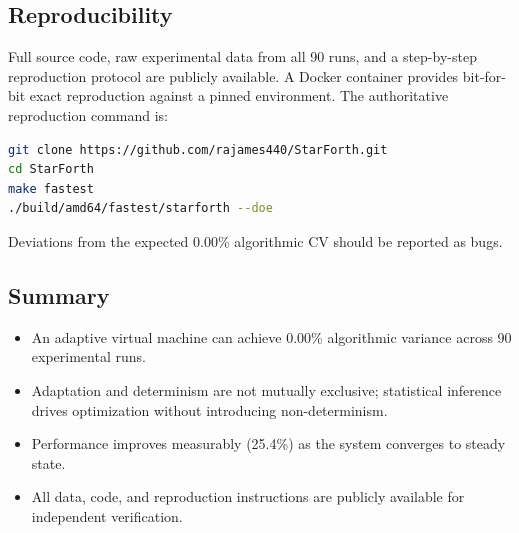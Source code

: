 \subsection{Reproducibility}

Full source code, raw experimental data from all 90 runs, and a
step-by-step reproduction protocol are publicly available. A Docker container
provides bit-for-bit exact reproduction against a pinned environment. The
authoritative reproduction command is:

\begin{lstlisting}[language=bash]
git clone https://github.com/rajames440/StarForth.git
cd StarForth
make fastest
./build/amd64/fastest/starforth --doe
\end{lstlisting}

Deviations from the expected 0.00\% algorithmic CV should be reported as bugs.

\subsection{Summary}

\begin{itemize}
  \item An adaptive virtual machine can achieve 0.00\% algorithmic variance
    across 90 experimental runs.
  \item Adaptation and determinism are not mutually exclusive; statistical
    inference drives optimization without introducing non-determinism.
  \item Performance improves measurably (25.4\%) as the system converges to
    steady state.
  \item All data, code, and reproduction instructions are publicly available
    for independent verification.
\end{itemize}
